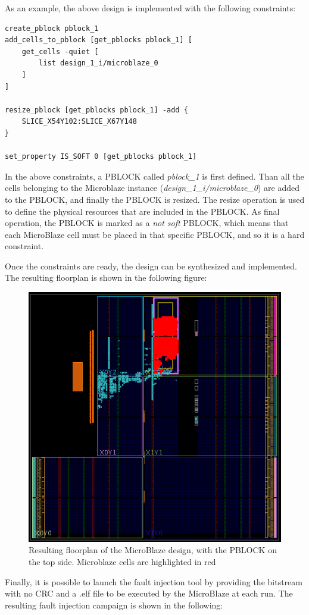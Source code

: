 As an example, the above design is implemented with the following constraints:

\begin{lstlisting}[style=tcl]
create_pblock pblock_1
add_cells_to_pblock [get_pblocks pblock_1] [
    get_cells -quiet [
        list design_1_i/microblaze_0
    ]
]

resize_pblock [get_pblocks pblock_1] -add {
    SLICE_X54Y102:SLICE_X67Y148
}

set_property IS_SOFT 0 [get_pblocks pblock_1]
\end{lstlisting}

In the above constraints, a PBLOCK called \textit{pblock\_1} is first defined. Than all the cells belonging to the Microblaze instance (\textit{design\_1\_i/microblaze\_0}) are added to the PBLOCK, and finally the PBLOCK is resized. The resize operation is used to define the physical resources that are included in the PBLOCK. As final operation, the PBLOCK is marked as a \textit{not soft} PBLOCK, which means that each MicroBlaze cell must be placed in that specific PBLOCK, and so it is a hard constraint.\bigskip

Once the constraints are ready, the design can be synthesized and implemented. The resulting floorplan is shown in the following figure:

\begin{figure}[H]
\centering
\includegraphics[width=0.7\linewidth]{images/chapter4/impl.png}
\caption{Resulting floorplan of the MicroBlaze design, with the PBLOCK on the top side. Microblaze cells are highlighted in red}
\end{figure}

Finally, it is possible to launch the fault injection tool by providing the bitstream with no CRC and a .elf file to be executed by the MicroBlaze at each run. The resulting fault injection campaign is shown in the following:

